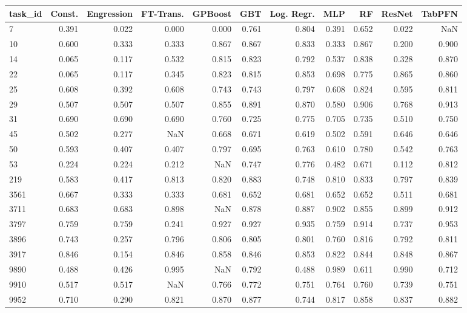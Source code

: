 \begin{tabular}{lrrrrrrrrrr}
\toprule
task\_id & Const. & Engression & FT-Trans. & GPBoost & GBT & Log. Regr. & MLP & RF & ResNet & TabPFN \\
\midrule
7 & 0.391 & 0.022 & 0.000 & 0.000 & 0.761 & 0.804 & 0.391 & 0.652 & 0.022 & NaN \\
10 & 0.600 & 0.333 & 0.333 & 0.867 & 0.867 & 0.833 & 0.333 & 0.867 & 0.200 & 0.900 \\
14 & 0.065 & 0.117 & 0.532 & 0.815 & 0.823 & 0.792 & 0.537 & 0.838 & 0.328 & 0.870 \\
22 & 0.065 & 0.117 & 0.345 & 0.823 & 0.815 & 0.853 & 0.698 & 0.775 & 0.865 & 0.860 \\
25 & 0.608 & 0.392 & 0.608 & 0.743 & 0.743 & 0.797 & 0.608 & 0.824 & 0.595 & 0.811 \\
29 & 0.507 & 0.507 & 0.507 & 0.855 & 0.891 & 0.870 & 0.580 & 0.906 & 0.768 & 0.913 \\
31 & 0.690 & 0.690 & 0.690 & 0.760 & 0.725 & 0.775 & 0.705 & 0.735 & 0.510 & 0.750 \\
45 & 0.502 & 0.277 & NaN & 0.668 & 0.671 & 0.619 & 0.502 & 0.591 & 0.646 & 0.646 \\
50 & 0.593 & 0.407 & 0.407 & 0.797 & 0.695 & 0.763 & 0.610 & 0.780 & 0.542 & 0.763 \\
53 & 0.224 & 0.224 & 0.212 & NaN & 0.747 & 0.776 & 0.482 & 0.671 & 0.112 & 0.812 \\
219 & 0.583 & 0.417 & 0.813 & 0.820 & 0.883 & 0.748 & 0.810 & 0.833 & 0.797 & 0.839 \\
3561 & 0.667 & 0.333 & 0.333 & 0.681 & 0.652 & 0.681 & 0.652 & 0.652 & 0.511 & 0.681 \\
3711 & 0.683 & 0.683 & 0.898 & NaN & 0.878 & 0.887 & 0.902 & 0.855 & 0.899 & 0.912 \\
3797 & 0.759 & 0.759 & 0.241 & 0.927 & 0.927 & 0.935 & 0.759 & 0.914 & 0.737 & 0.953 \\
3896 & 0.743 & 0.257 & 0.796 & 0.806 & 0.805 & 0.801 & 0.760 & 0.816 & 0.792 & 0.811 \\
3917 & 0.846 & 0.154 & 0.846 & 0.858 & 0.846 & 0.853 & 0.822 & 0.844 & 0.848 & 0.867 \\
9890 & 0.488 & 0.426 & 0.995 & NaN & 0.792 & 0.488 & 0.989 & 0.611 & 0.990 & 0.712 \\
9910 & 0.517 & 0.517 & NaN & 0.766 & 0.772 & 0.751 & 0.764 & 0.760 & 0.739 & 0.751 \\
9952 & 0.710 & 0.290 & 0.821 & 0.870 & 0.877 & 0.744 & 0.817 & 0.858 & 0.837 & 0.882 \\

\end{tabular}
